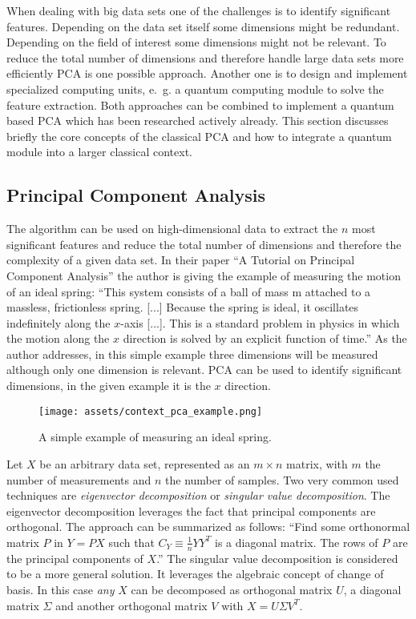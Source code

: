 \noindent
When dealing with big data sets one of the challenges is to identify significant features. Depending on the data set itself some dimensions might be redundant. Depending on the field of interest some dimensions might not be relevant. To reduce the total number of dimensions and therefore handle large data sets more efficiently PCA is one possible approach. Another one is to design and implement specialized computing units, e.~g. a quantum computing module to solve the feature extraction. Both approaches can be combined to implement a quantum based PCA which has been researched actively already. This section discusses briefly the core concepts of the classical PCA and how to integrate a quantum module into a larger classical context.

\subsection{Principal Component Analysis}
\label{subsec:pca}
The algorithm can be used on high-dimensional data to extract the $n$ most significant features and reduce the total number of dimensions and therefore the complexity of a given data set. In their paper \enquote{A Tutorial on Principal Component Analysis} \cite{Shlen_2014} the author is giving the example of measuring the motion of an ideal spring: \enquote{This system consists of a ball of mass m attached to a massless, frictionless spring. [...] Because the spring is ideal, it oscillates indefinitely along the $x$-axis [...]. This is a standard problem in physics in which the motion along the $x$ direction is solved by an explicit function of time.} As the author addresses, in this simple example three dimensions will be measured although only one dimension is relevant. PCA can be used to identify significant dimensions, in the given example it is the $x$ direction.

\begin{figure}
  \centering
  \texttt{[image: assets/context\_pca\_example.png]}
  \caption{A simple example of measuring an ideal spring. \cite{Shlen_2014}}
  \label{fig:pcaexample}
\end{figure}

Let $X$ be an arbitrary data set, represented as an $m \times n$ matrix, with $m$ the number of measurements and $n$ the number of samples. Two very common used techniques are \emph{eigenvector decomposition} or \emph{singular value decomposition}. The eigenvector decomposition leverages the fact that principal components are orthogonal. The approach can be summarized as follows: \enquote{Find some orthonormal matrix $P$ in $Y = PX$ such that $C_Y \equiv \frac{1}{n} YY^T$ is a diagonal matrix. The rows of $P$ are the principal components of $X$.} The singular value decomposition is considered to be a more general solution. It leverages the algebraic concept of change of basis. In this case \emph{any} $X$ can be decomposed as orthogonal matrix $U$, a diagonal matrix $\Sigma$ and another orthogonal matrix $V$ with $X = U\Sigma V^T$. \cite{Shlen_2014}

